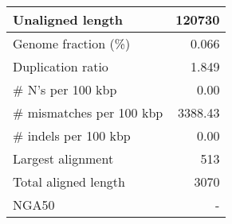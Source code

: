 \documentclass[12pt,a4paper]{article}
\begin{document}
\begin{table}[ht]
\begin{center}
\begin{tabular}{|l*{1}{|r}|}
Unaligned length & 120730 \\ \hline
Genome fraction (\%) & 0.066 \\ \hline
Duplication ratio & 1.849 \\ \hline
\# N's per 100 kbp & 0.00 \\ \hline
\# mismatches per 100 kbp & 3388.43 \\ \hline
\# indels per 100 kbp & 0.00 \\ \hline
Largest alignment & 513 \\ \hline
Total aligned length & 3070 \\ \hline
NGA50 & - \\ \hline
\end{tabular}
\end{center}
\end{table}
\end{document}

